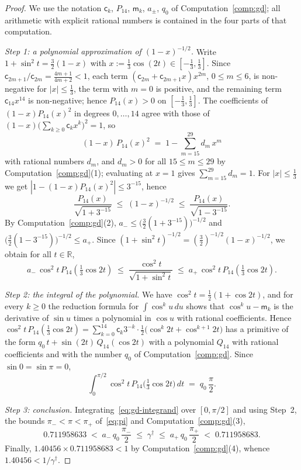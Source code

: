 \documentclass[11pt,reqno]{amsart}
\theoremstyle{definition}
\numberwithin{equation}{section}
\newcommand{\R}{\mathbb{R}}
\newcommand{\gd}{\gamma^\dagger}
\begin{document}
\begin{proof}
We use the notation $\mathsf{c}_k$, $P_{14}$, $\mathsf{m}_k$, $a_\pm$, $q_0$ of Computation~\ref{comp:gd}; all arithmetic with explicit rational numbers is contained in the four parts of that computation.

\emph{Step 1: a polynomial approximation of $(1-x)^{-1/2}$.} Write $1 + \sin^2 t = \frac{3}{2}(1 - x)$ with $x := \frac{1}{3}\cos(2t) \in [-\tfrac{1}{3}, \tfrac{1}{3}]$. Since $\mathsf{c}_{2m+1}/\mathsf{c}_{2m} = \frac{4m+1}{4m+2} < 1$, each term $(\mathsf{c}_{2m} + \mathsf{c}_{2m+1} x) x^{2m}$, $0 \le m \le 6$, is non-negative for $|x|\le\frac13$, the term with $m=0$ is positive, and the remaining term $\mathsf{c}_{14}x^{14}$ is non-negative; hence $P_{14}(x) > 0$ on $[-\tfrac{1}{3}, \tfrac{1}{3}]$. The coefficients of $(1-x)P_{14}(x)^2$ in degrees $0,\dots,14$ agree with those of $(1-x)\bigl(\sum_{k\ge0}\mathsf{c}_kx^k\bigr)^2=1$, so
\[
  (1 - x)\, P_{14}(x)^2 \;=\; 1 - \sum_{m=15}^{29} d_m\, x^m
\]
with rational numbers $d_m$, and $d_m > 0$ for all $15\le m\le29$ by Computation~\ref{comp:gd}(1); evaluating at $x = 1$ gives $\sum_{m=15}^{29} d_m = 1$. For $|x| \le \frac{1}{3}$ we get $|1 - (1 - x)P_{14}(x)^2| \le 3^{-15}$, hence
\[
  \frac{P_{14}(x)}{\sqrt{1+3^{-15}}}\;\le\;(1-x)^{-1/2}\;\le\;\frac{P_{14}(x)}{\sqrt{1-3^{-15}}} .
\]
By Computation~\ref{comp:gd}(2), $a_-\le\bigl(\frac32(1+3^{-15})\bigr)^{-1/2}$ and $\bigl(\frac32(1-3^{-15})\bigr)^{-1/2}\le a_+$. Since $(1+\sin^2t)^{-1/2}=(\frac32)^{-1/2}(1-x)^{-1/2}$, we obtain for all $t \in \R$,
\begin{equation}\label{eq:gd-integrand}
  a_-\, \cos^2 t\, P_{14}\!\left(\tfrac{1}{3}\cos 2t\right)
  \;\le\; \frac{\cos^2 t}{\sqrt{1 + \sin^2 t}}
  \;\le\; a_+\, \cos^2 t\, P_{14}\!\left(\tfrac{1}{3}\cos 2t\right).
\end{equation}

\emph{Step 2: the integral of the polynomial.} We have $\cos^2t=\frac12(1+\cos2t)$, and for every $k\ge0$ the reduction formula for $\int\cos^ku\,du$ shows that $\cos^ku-\mathsf{m}_k$ is the derivative of $\sin u$ times a polynomial in $\cos u$ with rational coefficients. Hence $\cos^2 t\,P_{14}(\frac{1}{3}\cos 2t)=\sum_{k=0}^{14}\mathsf{c}_k3^{-k}\cdot\frac12\bigl(\cos^k2t+\cos^{k+1}2t\bigr)$ has a primitive of the form $q_0\, t + \sin(2t)\, Q_{14}(\cos 2t)$ with a polynomial $Q_{14}$ with rational coefficients and with the number $q_0$ of Computation~\ref{comp:gd}. Since $\sin 0 = \sin \pi = 0$,
\[
  \int_0^{\pi/2} \cos^2 t\, P_{14}\bigl(\tfrac{1}{3}\cos 2t\bigr)\,dt \;=\; q_0\, \frac{\pi}{2} .
\]

\emph{Step 3: conclusion.} Integrating~\eqref{eq:gd-integrand} over $[0,\pi/2]$ and using Step~2, the bounds $\pi_-<\pi<\pi_+$ of~\eqref{eq:pi} and Computation~\ref{comp:gd}(3),
\[
  0.711958633\;<\;a_-\,q_0\,\frac{\pi_-}2\;\le\;\gd\;\le\;a_+\,q_0\,\frac{\pi_+}2\;<\;0.711958683 .
\]
Finally, $1.40456\times0.711958683<1$ by Computation~\ref{comp:gd}(4), whence $1.40456 < 1/\gd$.
\end{proof}
\end{document}
